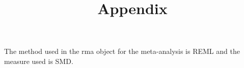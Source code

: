 \documentclass[11pt, a4paper]{article}
\begin{document}


\date{}
\title{Appendix}

\maketitle











\bigskip






The method used in the rma object for the meta-analysis is REML and the measure used is SMD.









\begin{table}[ht]
\centering
\caption{Results of the meta-analysis. ES = Effect Size, Q = Test for residual heterogeneity, $I^2$ = Residual heterogeneity, Egger's test (SE used as the predictor) and the fails-safe number (FSN) for publication bias testing according to 'Rosenberg'.} 
{\footnotesize
{}
}
\end{table}
\end{document}
